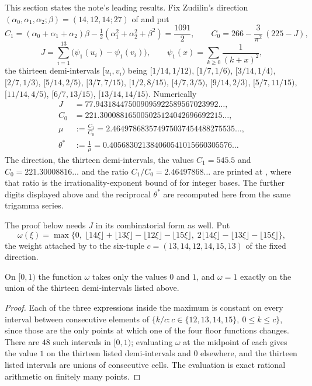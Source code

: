\documentclass[11pt]{article}
\begin{document}
This section states the note's leading results.  Fix Zudilin's direction
$(\alpha_0,\alpha_1,\alpha_2;\beta)=(14,12,14;27)$ of
\cite[Sec.~5]{zudilin2004} and put
\[
 C_1=(\alpha_0+\alpha_1+\alpha_2)\beta-\tfrac12(\alpha_1^{2}+\alpha_2^{2}+\beta^{2})
 =\frac{1091}{2},
 \qquad
 C_0=266-\frac{3}{\pi^{2}}\,(225-J),
\]
\[
 J=\sum_{i=1}^{13}\bigl(\psi_1(u_i)-\psi_1(v_i)\bigr),
 \qquad
 \psi_1(x)=\sum_{k\ge0}\frac1{(k+x)^{2}},
\]
the thirteen demi-intervals $[u_i,v_i)$ being
$[1/14,1/12)$, $[1/7,1/6)$, $[3/14,1/4)$, $[2/7,1/3)$, $[5/14,2/5)$,
$[3/7,7/15)$, $[1/2,8/15)$, $[4/7,3/5)$, $[9/14,2/3)$, $[5/7,11/15)$,
$[11/14,4/5)$, $[6/7,13/15)$, $[13/14,14/15)$.  Numerically
\begin{align*}
 J&=77.943184475009095922589567023992\ldots,\\
 C_0&=221.300088165005025124042696692215\ldots,\\
 \mu&:=\frac{C_1}{C_0}=2.464978683574975037454488275535\ldots,\\
 \theta^{*}&:=\frac1\mu=0.405683021384060541015660305576\ldots
\end{align*}
The direction, the thirteen demi-intervals, the values $C_1=545.5$ and
$C_0=221.30008816\ldots$ and the ratio $C_1/C_0=2.46497868\ldots$ are printed at
\cite[p.~162]{zudilin2004}, where that ratio is the irrationality-exponent bound
of \cite[Thm.~1, p.~154]{zudilin2004} for integer bases.  The further digits
displayed above and the reciprocal $\theta^{*}$ are recomputed here from the
same trigamma series.

The proof below needs $J$ in its combinatorial form as well.  Put
\[
 \omega(\xi)=\max\bigl\{0,\;
 \lfloor14\xi\rfloor+\lfloor13\xi\rfloor-\lfloor12\xi\rfloor-\lfloor15\xi\rfloor,\;
 2\lfloor14\xi\rfloor-\lfloor13\xi\rfloor-\lfloor15\xi\rfloor\bigr\},
\]
the weight attached by \cite[(26)]{zudilin2004} to the six-tuple
$c=(13,14,12,14,15,13)$ of the fixed direction.

\begin{lemma}\label{long1049:res:omega-indicator}
On $[0,1)$ the function $\omega$ takes only the values $0$ and $1$, and
$\omega=1$ exactly on the union of the thirteen demi-intervals listed above.
\end{lemma}

\begin{proof}
Each of the three expressions inside the maximum is constant on every interval
between consecutive elements of
$\{k/c: c\in\{12,13,14,15\},\ 0\le k\le c\}$, since those are the only points at
which one of the four floor functions changes.  There are $48$ such intervals in
$[0,1)$; evaluating $\omega$ at the midpoint of each gives the value $1$ on the
thirteen listed demi-intervals and $0$ elsewhere, and the thirteen listed
intervals are unions of consecutive cells.  The evaluation is exact rational
arithmetic on finitely many points.
\end{proof}
\end{document}
